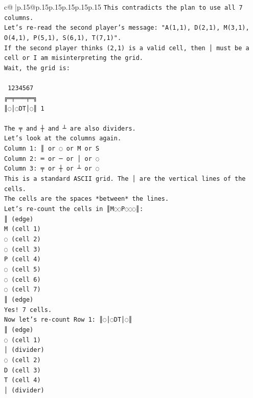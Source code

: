 \documentclass{article}
\begin{document}
{\begin{supertabular}{c@{$\;$}|p{.15\linewidth}@{}p{.15\linewidth}p{.15\linewidth}p{.15\linewidth}p{.15\linewidth}p{.15\linewidth}}
{{{\texttt{This contradicts the plan to use all 7 columns.} \\
\texttt{Let's re{-}read the second player's message: "A(1,1), D(2,1), M(3,1), O(4,1), P(5,1), S(6,1), T(7,1)".} \\
\texttt{If the second player thinks (2,1) is a valid cell, then │ must be a cell or I am misinterpreting the grid.} \\
\texttt{Wait, the grid is:} \\
\\ 
\texttt{ 1234567} \\
\texttt{╔═╤═══╤═╗} \\
\texttt{║◌│◌DT│◌║ 1} \\
\\ 
\texttt{The ╤ and ┼ and ┴ are also dividers.} \\
\texttt{Let's look at the columns again.} \\
\texttt{Column 1: ║ or ◌ or M or S} \\
\texttt{Column 2: ═ or ─ or │ or ◌} \\
\texttt{Column 3: ╤ or ┼ or ┴ or ◌} \\
\texttt{This is a standard ASCII grid. The │ are the vertical lines of the cells.} \\
\texttt{The cells are the spaces *between* the lines.} \\
\texttt{Let's re{-}count the cells in ║M◌◌P◌◌◌║:} \\
\texttt{║ (edge)} \\
\texttt{M (cell 1)} \\
\texttt{◌ (cell 2)} \\
\texttt{◌ (cell 3)} \\
\texttt{P (cell 4)} \\
\texttt{◌ (cell 5)} \\
\texttt{◌ (cell 6)} \\
\texttt{◌ (cell 7)} \\
\texttt{║ (edge)} \\
\texttt{Yes! 7 cells.} \\
\texttt{Now let's re{-}count Row 1: ║◌│◌DT│◌║} \\
\texttt{║ (edge)} \\
\texttt{◌ (cell 1)} \\
\texttt{│ (divider)} \\
\texttt{◌ (cell 2)} \\
\texttt{D (cell 3)} \\
\texttt{T (cell 4)} \\
\texttt{│ (divider)} \\
}}}
\end{supertabular}}
\end{document}
